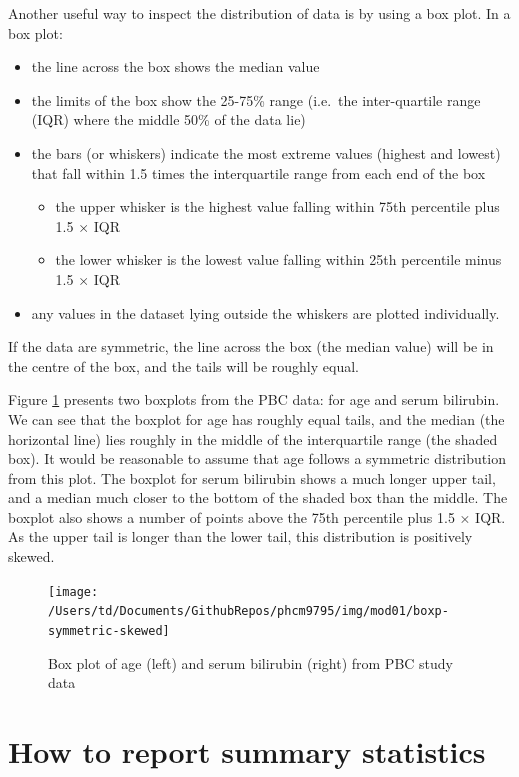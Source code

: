 \documentclass[
]{memoir}
\providecommand{\tightlist}{%
  \setlength{\itemsep}{0pt}\setlength{\parskip}{0pt}}
\begin{document}
Another useful way to inspect the distribution of data is by using a box plot. In a box plot:

\begin{itemize}
\tightlist
\item
  the line across the box shows the median value
\item
  the limits of the box show the 25-75\% range (i.e.~the inter-quartile range (IQR) where the middle 50\% of the data lie)
\item
  the bars (or whiskers) indicate the most extreme values (highest and lowest) that fall within 1.5 times the interquartile range from each end of the box

  \begin{itemize}
  \tightlist
  \item
    the upper whisker is the highest value falling within 75th percentile plus 1.5 × IQR
  \item
    the lower whisker is the lowest value falling within 25th percentile minus 1.5 × IQR
  \end{itemize}
\item
  any values in the dataset lying outside the whiskers are plotted individually.
\end{itemize}

If the data are symmetric, the line across the box (the median value) will be in the centre of the box, and the tails will be roughly equal.

Figure \ref{fig:fig-1-7} presents two boxplots from the PBC data: for age and serum bilirubin. We can see that the boxplot for age has roughly equal tails, and the median (the horizontal line) lies roughly in the middle of the interquartile range (the shaded box). It would be reasonable to assume that age follows a symmetric distribution from this plot. The boxplot for serum bilirubin shows a much longer upper tail, and a median much closer to the bottom of the shaded box than the middle. The boxplot also shows a number of points above the 75th percentile plus 1.5 × IQR. As the upper tail is longer than the lower tail, this distribution is positively skewed.

\begin{figure}
\texttt{[image: /Users/td/Documents/GithubRepos/phcm9795/img/mod01/boxp-symmetric-skewed]} \caption{Box plot of age (left) and serum bilirubin (right) from PBC study data}\label{fig:fig-1-7}
\end{figure}

\hypertarget{how-to-report-summary-statistics}{%
\section{How to report summary statistics}\label{how-to-report-summary-statistics}}
\end{document}
